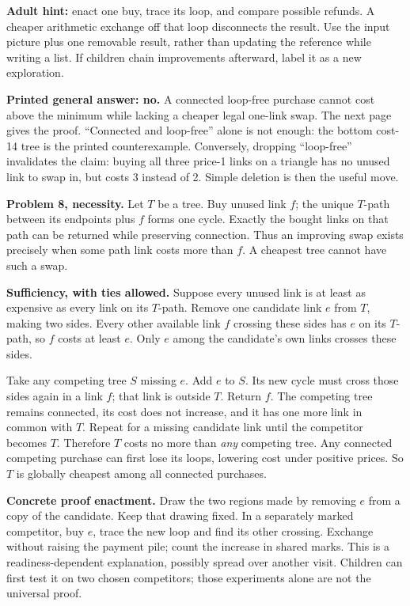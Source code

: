 \documentclass[11pt,letterpaper]{article}
\newcommand\topic[1]{\par\vspace{5pt}{\large\bfseries #1}\par}
\begin{document}
\textbf{Adult hint:} enact one buy, trace its loop, and compare possible refunds. A cheaper arithmetic exchange off that loop disconnects the result. Use the input picture plus one removable result, rather than updating the reference while writing a list. If children chain improvements afterward, label it as a new exploration.

\textbf{Printed general answer: no.} A connected loop-free purchase cannot cost above the minimum while lacking a cheaper legal one-link swap. The next page gives the proof. ``Connected and loop-free'' alone is not enough: the bottom cost-14 tree is the printed counterexample. Conversely, dropping ``loop-free'' invalidates the claim: buying all three price-1 links on a triangle has no unused link to swap in, but costs 3 instead of 2. Simple deletion is then the useful move.
\newpage

\topic{From local tests to all competitors}
\textbf{Problem 8, necessity.} Let $T$ be a tree. Buy unused link $f$; the unique $T$-path between its endpoints plus $f$ forms one cycle. Exactly the bought links on that path can be returned while preserving connection. Thus an improving swap exists precisely when some path link costs more than $f$. A cheapest tree cannot have such a swap.

\textbf{Sufficiency, with ties allowed.} Suppose every unused link is at least as expensive as every link on its $T$-path. Remove one candidate link $e$ from $T$, making two sides. Every other available link $f$ crossing these sides has $e$ on its $T$-path, so $f$ costs at least $e$. Only $e$ among the candidate's own links crosses these sides.

Take any competing tree $S$ missing $e$. Add $e$ to $S$. Its new cycle must cross those sides again in a link $f$; that link is outside $T$. Return $f$. The competing tree remains connected, its cost does not increase, and it has one more link in common with $T$. Repeat for a missing candidate link until the competitor becomes $T$. Therefore $T$ costs no more than \emph{any} competing tree. Any connected competing purchase can first lose its loops, lowering cost under positive prices. So $T$ is globally cheapest among all connected purchases.

\textbf{Concrete proof enactment.} Draw the two regions made by removing $e$ from a copy of the candidate. Keep that drawing fixed. In a separately marked competitor, buy $e$, trace the new loop and find its other crossing. Exchange without raising the payment pile; count the increase in shared marks. This is a readiness-dependent explanation, possibly spread over another visit. Children can first test it on two chosen competitors; those experiments alone are not the universal proof.
\end{document}
